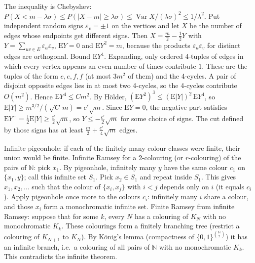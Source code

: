 \documentclass[11pt,a4paper]{article}
\begin{document}
 The inequality is Chebyshev: $P(X<m-\lambda\sigma)\le P(|X-m|\ge\lambda\sigma)\le \operatorname{Var}X/(\lambda\sigma)^2\le1/\lambda^2$.
 Put independent random signs $\varepsilon_v=\pm1$ on the vertices and let $X$ be the number of edges whose endpoints get different signs. Then $X=\frac m2-\frac12Y$ with $Y=\sum_{uv\in E}\varepsilon_u\varepsilon_v$, $\mathrm EY=0$ and $\mathrm EY^2=m$, because the products $\varepsilon_u\varepsilon_v$ for distinct edges are orthogonal.
 Bound $\mathrm EY^4$. Expanding, only ordered 4-tuples of edges in which every vertex appears an even number of times contribute $1$. These are the tuples of the form $e,e,f,f$ (at most $3m^2$ of them) and the 4-cycles. A pair of disjoint opposite edges lies in at most two 4-cycles, so the 4-cycles contribute $O(m^2)$. Hence $\mathrm EY^4\le Cm^2$.
 By H\"older, $(\mathrm EY^2)^3\le(\mathrm E|Y|)^2\,\mathrm EY^4$, so $\mathrm E|Y|\ge m^{3/2}/(\sqrt{C}\,m)=c'\sqrt m$. Since $\mathrm EY=0$, the negative part satisfies $\mathrm EY^-=\tfrac12\mathrm E|Y|\geq \tfrac{c'}{2}\sqrt m$, so $Y\le-\tfrac{c'}2\sqrt m$ for some choice of signs. The cut defined by those signs has at least $\frac m2+\frac{c'}4\sqrt m$ edges.

 Infinite pigeonhole: if each of the finitely many colour classes were finite, their union would be finite.
 Infinite Ramsey for a 2-colouring (or $r$-colouring) of the pairs of $\mathbb N$: pick $x_1$. By pigeonhole, infinitely many $y$ have the same colour $c_1$ on $\{x_1,y\}$; call this infinite set $S_1$. Pick $x_2\in S_1$ and repeat inside $S_1$. This gives $x_1,x_2,\dots$ such that the colour of $\{x_i,x_j\}$ with $i<j$ depends only on $i$ (it equals $c_i$).
 Apply pigeonhole once more to the colours $c_i$: infinitely many $i$ share a colour, and those $x_i$ form a monochromatic infinite set.
 Finite Ramsey from infinite Ramsey: suppose that for some $k$, every $N$ has a colouring of $K_N$ with no monochromatic $K_k$. These colourings form a finitely branching tree (restrict a colouring of $K_{N+1}$ to $K_N$). By K\"onig's lemma (compactness of $\{0,1\}^{\binom{\mathbb N}{2}}$) it has an infinite branch, i.e.\ a colouring of all pairs of $\mathbb N$ with no monochromatic $K_k$. This contradicts the infinite theorem.
\end{document}

